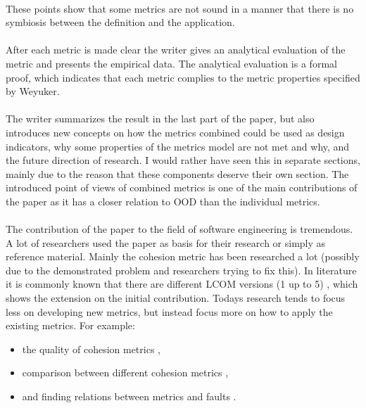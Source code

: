 \paragraph{}
These points show that some metrics are not sound in a manner that there is no symbiosis between the definition and
the application.

\paragraph{}
After each metric is made clear the writer gives an analytical evaluation of the metric and presents the empirical
data. The analytical evaluation is a formal proof, which indicates that each metric complies to the metric properties
specified by Weyuker.

\paragraph{}
The writer summarizes the result in the last part of the paper, but also introduces new concepts on how the metrics
combined could be used as design indicators, why some properties of the metrics model are not met and why, and the
future direction of research. I would rather have seen this in separate sections, mainly due to the reason that these
components deserve their own section. The introduced point of views of combined metrics is one of the main contributions
of the paper as it has a closer relation to OOD than the individual metrics.

\paragraph{}
The contribution of the paper to the field of software engineering is tremendous. A lot of researchers used the paper
as basis for their research or simply as reference material. Mainly the cohesion metric has been researched a lot (possibly
due to the demonstrated problem and researchers trying to fix this). In literature it is commonly known that there are
different LCOM versions (1 up to 5) \autocite{TOOLS-USA-2003-BadriB04}, which shows the extension on the initial contribution. Todays research
tends to focus less on developing new metrics, but instead focus more on how to apply the existing metrics. For example:

\begin{itemize}
\item the quality of cohesion metrics \autocite{DESOUKY} \autocite{JOHARI},
\item comparison between different cohesion metrics \autocite{JOSHI},
\item and finding relations between metrics and faults \autocite{LU} \autocite{SINGH} \autocite{DALLAL}.
\end{itemize}

